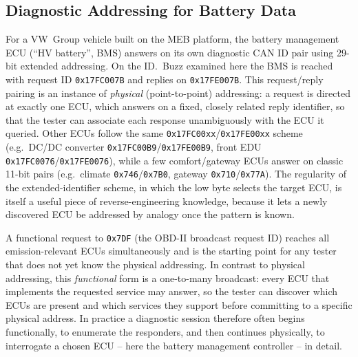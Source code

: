\documentclass[11pt,a4paper,oneside,parskip=half]{scrreprt}
\providecommand{\hex}{}\renewcommand{\hex}[1]{\texttt{0x#1}}
\begin{document}
\subsection{Diagnostic Addressing for Battery Data}
\label{ssec:diag_addr}
For a VW~Group vehicle built on the MEB platform, the battery management ECU (``HV battery'', BMS) answers on its own diagnostic CAN ID pair using 29-bit extended addressing. On the ID.~Buzz examined here the BMS is reached with request ID \hex{17FC007B} and replies on \hex{17FE007B}. This request/reply pairing is an instance of \emph{physical} (point-to-point) addressing: a request is directed at exactly one ECU, which answers on a fixed, closely related reply identifier, so that the tester can associate each response unambiguously with the ECU it queried. Other ECUs follow the same \hex{17FC00xx}/\hex{17FE00xx} scheme (e.g.\ DC/DC converter \hex{17FC00B9}/\hex{17FE00B9}, front EDU \hex{17FC0076}/\hex{17FE0076}), while a few comfort/gateway ECUs answer on classic 11-bit pairs (e.g.\ climate \hex{746}/\hex{7B0}, gateway \hex{710}/\hex{77A}). The regularity of the extended-identifier scheme, in which the low byte selects the target ECU, is itself a useful piece of reverse-engineering knowledge, because it lets a newly discovered ECU be addressed by analogy once the pattern is known.

A functional request to \hex{7DF} (the OBD-II broadcast request ID) reaches all emission-relevant ECUs simultaneously and is the starting point for any tester that does not yet know the physical addressing. In contrast to physical addressing, this \emph{functional} form is a one-to-many broadcast: every ECU that implements the requested service may answer, so the tester can discover which ECUs are present and which services they support before committing to a specific physical address. In practice a diagnostic session therefore often begins functionally, to enumerate the responders, and then continues physically, to interrogate a chosen ECU -- here the battery management controller -- in detail.
\end{document}
